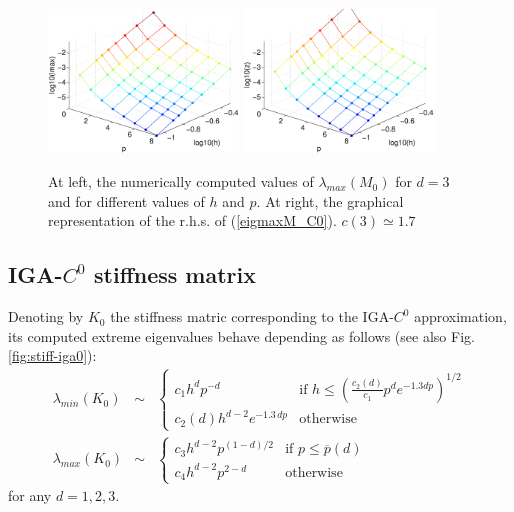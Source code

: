 \documentclass[11pt]{article}
\begin{document}
\begin{figure}
\begin{center}
\includegraphics[width=0.45\textwidth]{Images/iga0_eigM3max.eps}\quad
\includegraphics[width=0.45\textwidth]{Images/iga0_eigM3smax.eps}\\
\end{center}
\caption{At left, the numerically computed values of
$\lambda_{max}(M_0)$ for $d=3$ and
for different values of $h$ and $p$. At right,
the graphical representation of the r.h.s. of (\ref{eigmaxM_C0}). $c(3)
\simeq 1.7$}
\label{fig:massamax-iga0d3}
\end{figure}



\clearpage
\newpage
\subsection{IGA-$C^0$ stiffness matrix}
Denoting by $K_0$ the stiffness matric corresponding to the 
IGA-$C^0$ approximation, its computed extreme eigenvalues
behave  depending  as follows (see also 
Fig. \ref{fig:stiff-iga0}):
\begin{eqnarray}
\label{eigminK_C0}
\lambda_{min}(K_0)&\sim &\left\{\begin{array}{ll}
c_1 h^dp^{-d} & \mbox{if } h\leq \left(\frac{c_2(d)}{c_1} p^de^{-1.3 d p}\right)^{1/2}\\
c_2(d)h^{d-2}e^{-1.3\,dp} &\mbox{otherwise}
\end{array}\right.\\
\label{eigmaxK_C0}
\lambda_{max}(K_0)&\sim &
\left\{\begin{array}{ll}
c_3 h^{d-2}p^{(1-d)/2} & \mbox{if } p\leq \overline{p}(d)\\
c_4h^{d-2}p^{2-d}  &\mbox{otherwise}
\end{array}\right.
\end{eqnarray}
for any $d=1,2,3$.  
\end{document}
